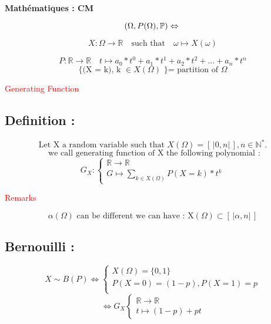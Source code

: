 \documentclass[a4paper,12pt]{article}
\begin{document}
\begin{center}
\textbf{Mathématiques : CM}
\end{center}

\[
(\Omega, P(\Omega), \mathbb{P}) \Leftrightarrow \\
\]

\bigskip
\begin{center}
\[
X : \Omega \rightarrow \mathbb{R}
\quad \text{such that} \quad
\omega \mapsto X(\omega)
\]
\bigskip

\[
P : \mathbb{R} \rightarrow \mathbb{R}
\quad t \mapsto a_0*t^0 + a_1 * t^1 + a_2 * t^2 +...+a_n * t^n
\]
\[
\text{\{(X = k), k } \in X(\Omega) \text{ \} = partition of }\Omega
\]

\end{center}


\begin{center}
\Large \textcolor{red}{Generating Function}
\end{center}
\subsection{Definition :}
\[
\text{Let X a random variable such that } X(\Omega) = \left[\,|0, n|\,\right]
, n \in \mathbb{N}^*.
\]
\[
\text{ we call generating function of X the following polynomial :}
\]
\[
  G_X : \begin{cases}
    \mathbb{R} \rightarrow \mathbb{R}\\
 G \mapsto \sum_{k \in X(\Omega)}{P(X = k) * t^k}
\end{cases}
\]

\textcolor{red}{Remarks}

 \[\alpha(\Omega) \text{ can be different we can have : X}(\Omega) \subset \left[\,|\alpha, n|\,\right] \]

\subsection{Bernouilli :}

\[
X \sim B(P) \Leftrightarrow
\begin{cases}
X (\Omega) = \{0,1\}\\
P(X= 0) = (1-p), P(X= 1) = p \\
\end{cases}
\]
\[
\Leftrightarrow G_X \begin{cases}
\mathbb{R} \rightarrow \mathbb{R}\\
t \mapsto (1-p) + pt
\end{cases}
\]
\end{document}
